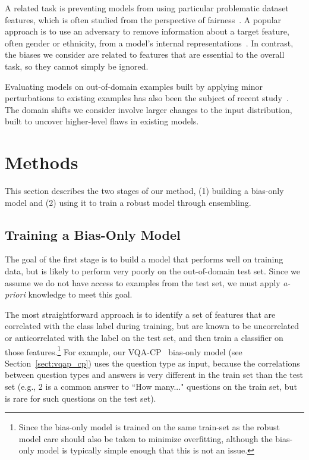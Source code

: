 \documentclass[11pt,a4paper]{article}
\begin{document}
A related task is preventing models from using particular problematic dataset features, which is often studied from the perspective of fairness~\cite{zhao2017men, burns2018women}. 
A popular approach is to use an adversary to remove information about a target feature, often gender or ethnicity, from a model's internal representations~\cite{edwards2015censoring, wang2018adversarial, kim2018learning}.
In contrast, the biases we consider 
are related to features that are essential to the overall task, so they cannot simply be ignored.


Evaluating models on out-of-domain examples built by applying minor perturbations to existing examples has also been the subject of recent study~\cite{szegedy2013intriguing,belinkov2017synthetic,carlini2018audio,glockner2018breaking}. The domain shifts we consider involve larger changes to the input distribution, built to uncover higher-level flaws in existing models. 

 
\section{Methods}
\newcommand{\vecsym}[1]{#1}

\label{sect:methods}
This section describes the two stages of our method, (1) building a bias-only model and (2) using it to train a robust model through ensembling. 

\subsection{Training a Bias-Only Model}
The goal of the first stage is to build a model that performs well on training data, but is likely to perform very poorly
on the out-of-domain test set. 
Since we assume we do not have access to examples from the test set, we must apply \textit{a-priori} knowledge to meet this goal.

The most straightforward approach is to identify a set of features that are correlated with the class label during training, but are known to be uncorrelated or anticorrelated with the label on the test set, and then train a classifier on those features.\footnote{Since the bias-only model is trained on the same train-set as the robust model care should also be taken to minimize overfitting, although the bias-only model is typically simple enough that this is not an issue.} For example, our VQA-CP~\cite{vqa_cp} bias-only model (see Section~\ref{sect:vqap_cp}) uses the question type as input, because the correlations between question types and answers is very different in the train set than the test set
(e.g., 2 is a common answer to ``How many..." questions on the train set, but is rare for such questions on the test set).
\end{document}
